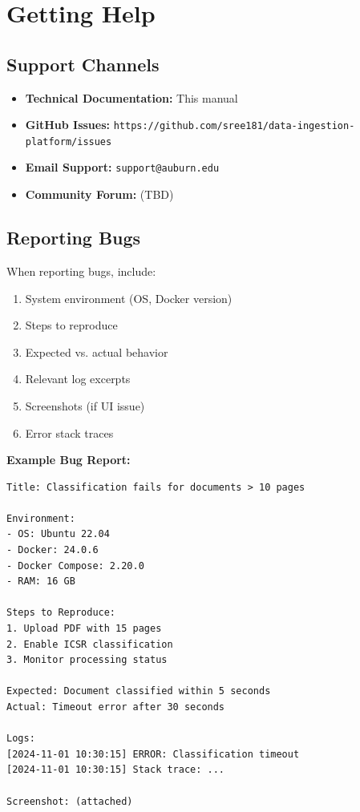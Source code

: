 \section{Getting Help}

\subsection{Support Channels}

\begin{itemize}
    \item \textbf{Technical Documentation:} This manual
    \item \textbf{GitHub Issues:} \texttt{https://github.com/sree181/data-ingestion-platform/issues}
    \item \textbf{Email Support:} \texttt{support@auburn.edu}
    \item \textbf{Community Forum:} (TBD)
\end{itemize}

\subsection{Reporting Bugs}

When reporting bugs, include:
\begin{enumerate}
    \item System environment (OS, Docker version)
    \item Steps to reproduce
    \item Expected vs. actual behavior
    \item Relevant log excerpts
    \item Screenshots (if UI issue)
    \item Error stack traces
\end{enumerate}

\textbf{Example Bug Report:}
\begin{lstlisting}[style=pythonstyle]
Title: Classification fails for documents > 10 pages

Environment:
- OS: Ubuntu 22.04
- Docker: 24.0.6
- Docker Compose: 2.20.0
- RAM: 16 GB

Steps to Reproduce:
1. Upload PDF with 15 pages
2. Enable ICSR classification
3. Monitor processing status

Expected: Document classified within 5 seconds
Actual: Timeout error after 30 seconds

Logs:
[2024-11-01 10:30:15] ERROR: Classification timeout
[2024-11-01 10:30:15] Stack trace: ...

Screenshot: (attached)
\end{lstlisting}



